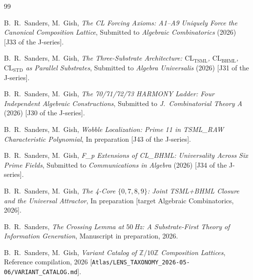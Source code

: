 \documentclass[11pt,reqno]{amsart}
\theoremstyle{plain}
\theoremstyle{definition}
\theoremstyle{remark}
\newcommand{\Z}{\mathbb{Z}}
\newcommand{\TSML}{\mathrm{TSML}}
\newcommand{\BHML}{\mathrm{BHML}}
\begin{document}
\begin{thebibliography}{99}

B.~R.~Sanders, M.~Gish,
\emph{The CL Forcing Axioms: A1--A9 Uniquely Force the Canonical Composition Lattice},
Submitted to \emph{Algebraic Combinatorics} (2026)
[J33 of the J-series].

B.~R.~Sanders, M.~Gish,
\emph{The Three-Substrate Architecture: $\mathrm{CL}_\TSML$, $\mathrm{CL}_\BHML$, $\mathrm{CL}_\mathrm{STD}$ as Parallel Substrates},
Submitted to \emph{Algebra Universalis} (2026)
[J31 of the J-series].

B.~R.~Sanders, M.~Gish,
\emph{The 70/71/72/73 HARMONY Ladder: Four Independent Algebraic Constructions},
Submitted to \emph{J.\ Combinatorial Theory A} (2026)
[J30 of the J-series].

B.~R.~Sanders, M.~Gish,
\emph{Wobble Localization: Prime 11 in TSML\_RAW Characteristic Polynomial},
In preparation [J43 of the J-series].

B.~R.~Sanders, M.~Gish,
\emph{F_p Extensions of CL\_BHML: Universality Across Six Prime Fields},
Submitted to \emph{Communications in Algebra} (2026)
[J34 of the J-series].

B.~R.~Sanders, M.~Gish,
\emph{The 4-Core $\{0,7,8,9\}$: Joint TSML+BHML Closure and the Universal Attractor},
In preparation [target Algebraic Combinatorics, 2026].

B.~R.~Sanders,
\emph{The Crossing Lemma at $50\,$Hz: A Substrate-First Theory of Information Generation},
Manuscript in preparation, 2026.

B.~R.~Sanders, M.~Gish,
\emph{Variant Catalog of $\Z/10\Z$ Composition Lattices},
Reference compilation, 2026
[\texttt{Atlas/LENS\_TAXONOMY\_2026-05-06/VARIANT\_CATALOG.md}].

\end{thebibliography}
\end{document}
